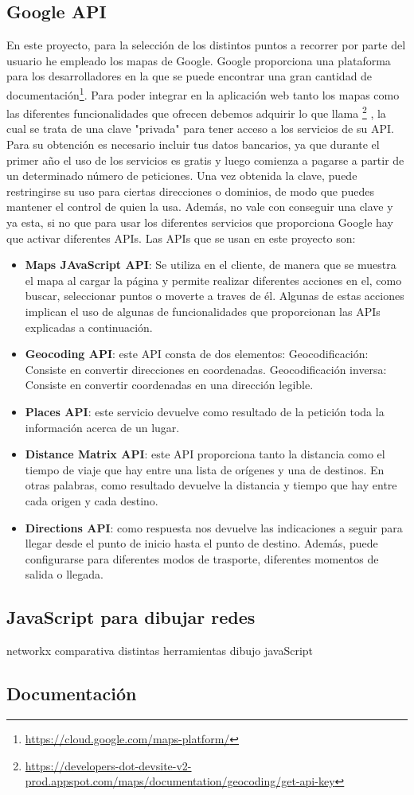 \subsection{Google API}
En este proyecto, para la selección de los distintos puntos a recorrer por parte del usuario he empleado los mapas de Google. Google proporciona una plataforma para los desarrolladores en la que se puede encontrar una gran cantidad de documentación\footnote{\url{https://cloud.google.com/maps-platform/}}.
Para poder integrar en la aplicación web tanto los mapas como las diferentes funcionalidades que ofrecen debemos adquirir lo que llama \footnote{\url{https://developers-dot-devsite-v2-prod.appspot.com/maps/documentation/geocoding/get-api-key}} , la cual se trata de una clave "privada" para tener acceso a los servicios de su API. Para su obtención es necesario incluir tus datos bancarios, ya que durante el primer año el uso de los servicios es gratis y luego comienza a pagarse a partir de un determinado número de peticiones.
Una vez obtenida la clave, puede restringirse su uso para ciertas direcciones o dominios, de modo que puedes mantener el control de quien la usa. Además, no vale con conseguir una clave y ya esta, si no que para usar los diferentes servicios que proporciona Google hay que activar diferentes APIs.
Las APIs que se usan en este proyecto son:
\begin{itemize}
	\item \textbf{Maps JAvaScript API}: Se utiliza en el cliente, de manera que se muestra el mapa al cargar la página y permite realizar diferentes acciones en el, como buscar, seleccionar puntos o moverte a traves de él. Algunas de estas acciones implican el uso de algunas de funcionalidades que proporcionan las APIs explicadas a continuación.
	\item \textbf{Geocoding API}: este API consta de dos elementos:
	\subitem Geocodificación: Consiste en convertir direcciones en coordenadas.
	\subitem Geocodificación inversa: Consiste en convertir coordenadas en una dirección legible.
	\item \textbf{Places API}: este servicio devuelve como resultado de la petición toda la información acerca de un lugar.
	\item \textbf{Distance Matrix API}: este API proporciona tanto la distancia como el tiempo de viaje que hay entre una lista de orígenes y una de destinos. En otras palabras, como resultado devuelve la distancia y tiempo que hay entre cada origen y cada destino.
	\item \textbf{Directions API}: como respuesta nos devuelve las indicaciones a seguir para llegar desde el punto de inicio hasta el punto de destino. Además, puede configurarse para diferentes modos de trasporte, diferentes momentos de salida o llegada.
\end{itemize}




\subsection{JavaScript para dibujar redes}
networkx
comparativa distintas herramientas dibujo javaScript

\subsection{Documentación}



